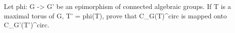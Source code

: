 Let phi: G -> G' be an epimorphism of connected algebraic groups. If T is a maximal torus of G, T' = phi(T), prove that C_G(T)^circ is mapped onto C_{G'}(T')^circ.
